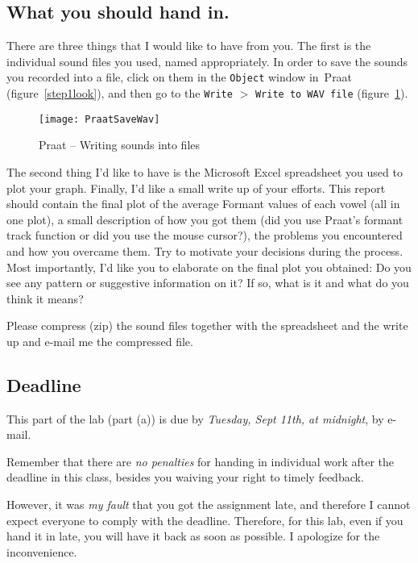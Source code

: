 \documentclass{article}
\newcommand{\soft}[1]{\textsf{#1}}
\newcommand{\softmenu}[1]{\texttt{#1}}
\newcommand{\MSExcel}{\soft{Microsoft\texttrademark{} Excel}}
\newcommand{\Praat}{\soft{Praat}}
\begin{document}
\subsection{What you should hand in.}

There are three things that I would like to have from you. The first is the individual sound files you used, named appropriately. In order to save the sounds you recorded into a file, click on them in the \softmenu{Object} window in~\Praat{} (figure~\ref{step1look}), and then go to the \softmenu{Write} $>$ \softmenu{Write to WAV file} (figure~\ref{step1savewav}).

\begin{figure}[!tbp]
\caption{\Praat{} -- Writing sounds into files}
\label{step1savewav}
	\begin{center}
		\texttt{[image: PraatSaveWav]}
	\end{center}
\end{figure}

The second thing I'd like to have is the \MSExcel{} spreadsheet you used to plot your graph. Finally, I'd like a small write up of your efforts. This report should contain the final plot of the average Formant values of each vowel (all in one plot), a small description of how you got them (did you use Praat's formant track function or did you use the mouse cursor?), the problems you encountered and how you overcame them. Try to motivate your decisions during the process. Most importantly, I'd like you to elaborate on the final plot you obtained: Do you see any pattern or suggestive information on it? If so, what is it and what do you think it means?

Please compress (zip) the sound files together with the spreadsheet and the write up and e-mail me the compressed file.

\subsection{Deadline}

This part of the lab (part (a)) is due by \emph{Tuesday, Sept 11th, at midnight}, by e-mail.

Remember that there are \emph{no penalties} for handing in individual work after the deadline in this class, besides you waiving your right to timely feedback.

However, it was \emph{my fault} that you got the assignment late, and therefore I cannot expect everyone to comply with the deadline. Therefore, for this lab, even if you hand it in late, you will have it back as soon as possible. I apologize for the inconvenience.
\end{document}
